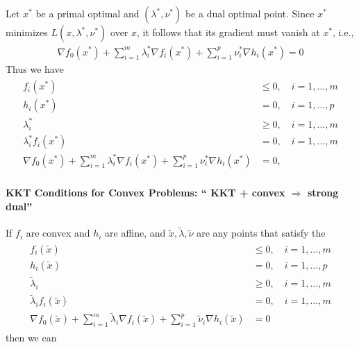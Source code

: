 \documentclass{article}
\begin{document}
Let $x^* $ be a primal optimal and $\left(\lambda^* , \nu^* \right)$ be a dual optimal point. Since $x^* $ minimizes $L\left(x, \lambda^* , \nu^* \right)$ over $x$, it follows that its gradient must vanish at $x^* $, i.e.,
\begin{align*}
\nabla f_{0}\left(x^* \right)+\sum_{i=1}^{m} \lambda_{i}^*  \nabla f_{i}\left(x^* \right)+\sum_{i=1}^{p} \nu_{i}^*  \nabla h_{i}\left(x^* \right)=0
\end{align*}
Thus we have 
\begin{align*}
\begin{aligned}
f_{i}\left(x^* \right) & \leq 0, \quad i=1, \ldots, m \\
h_{i}\left(x^* \right) &=0, \quad i=1, \ldots, p \\
\lambda_{i}^*  & \geq 0, \quad i=1, \ldots, m \\
\lambda_{i}^*  f_{i}\left(x^* \right) &=0, \quad i=1, \ldots, m \\
\nabla f_{0}\left(x^* \right)+\sum_{i=1}^{m} \lambda_{i}^*  \nabla f_{i}\left(x^* \right)+\sum_{i=1}^{p} \nu_{i}^*  \nabla h_{i}\left(x^* \right) &=0,
\end{aligned}
\end{align*}

\paragraph{KKT Conditions for Convex Problems: `` KKT + convex $\Longrightarrow$ strong dual''}

If $f_{i}$ are convex and $h_{i}$ are affine, and $\tilde{x}, \tilde{\lambda}, \tilde{\nu}$ are any points that satisfy the 
\begin{align*}
\begin{aligned}
f_{i}(\tilde{x}) & \leq 0, \quad i=1, \ldots, m \\
h_{i}(\tilde{x}) &=0, \quad i=1, \ldots, p \\
\tilde{\lambda}_{i} & \geq 0, \quad i=1, \ldots, m \\
\tilde{\lambda}_{i} f_{i}(\tilde{x}) &=0, \quad i=1, \ldots, m \\
\nabla f_{0}(\tilde{x})+\sum_{i=1}^{m} \tilde{\lambda}_{i} \nabla f_{i}(\tilde{x})+\sum_{i=1}^{p} \tilde{\nu}_{i} \nabla h_{i}(\tilde{x}) &=0
\end{aligned}
\end{align*}
then we can 
\end{document}
